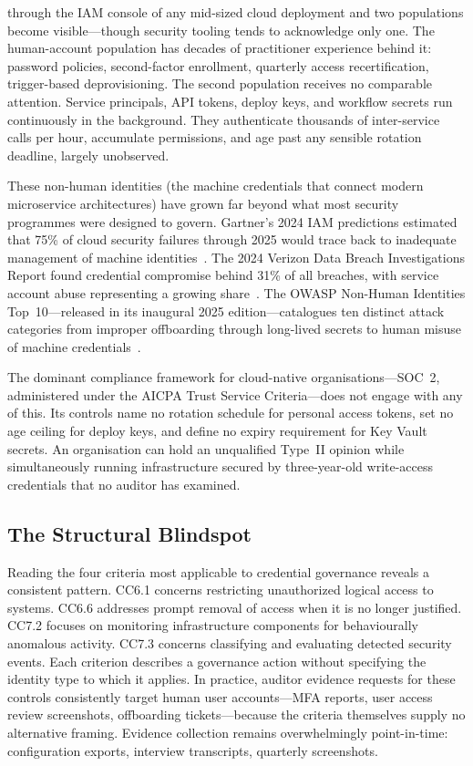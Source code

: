 \documentclass[journal]{IEEEtran}
\begin{document}
 through the IAM console of any mid-sized cloud deployment and two populations become visible---though security tooling tends to acknowledge only one. The human-account population has decades of practitioner experience behind it: password policies, second-factor enrollment, quarterly access recertification, trigger-based deprovisioning. The second population receives no comparable attention. Service principals, API tokens, deploy keys, and workflow secrets run continuously in the background. They authenticate thousands of inter-service calls per hour, accumulate permissions, and age past any sensible rotation deadline, largely unobserved.

These non-human identities (the machine credentials that connect modern microservice architectures) have grown far beyond what most security programmes were designed to govern. Gartner's 2024 IAM predictions estimated that 75\% of cloud security failures through 2025 would trace back to inadequate management of machine identities~\cite[p.\,4]{gartner2024nhi}. The 2024 Verizon Data Breach Investigations Report found credential compromise behind 31\% of all breaches, with service account abuse representing a growing share~\cite[p.\,8]{verizon2024dbir}. The OWASP Non-Human Identities Top~10---released in its inaugural 2025 edition---catalogues ten distinct attack categories from improper offboarding through long-lived secrets to human misuse of machine credentials~\cite{owaspnhi2025}.

The dominant compliance framework for cloud-native organisations---SOC~2, administered under the AICPA Trust Service Criteria---does not engage with any of this. Its controls name no rotation schedule for personal access tokens, set no age ceiling for deploy keys, and define no expiry requirement for Key Vault secrets. An organisation can hold an unqualified Type~II opinion while simultaneously running infrastructure secured by three-year-old write-access credentials that no auditor has examined.

\subsection{The Structural Blindspot}
\label{sec:blindspot}

Reading the four criteria most applicable to credential governance reveals a consistent pattern. CC6.1 concerns restricting unauthorized logical access to systems. CC6.6 addresses prompt removal of access when it is no longer justified. CC7.2 focuses on monitoring infrastructure components for behaviourally anomalous activity. CC7.3 concerns classifying and evaluating detected security events. Each criterion describes a governance action without specifying the identity type to which it applies. In practice, auditor evidence requests for these controls consistently target human user accounts---MFA reports, user access review screenshots, offboarding tickets---because the criteria themselves supply no alternative framing. Evidence collection remains overwhelmingly point-in-time: configuration exports, interview transcripts, quarterly screenshots.
\end{document}
